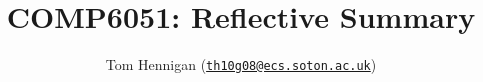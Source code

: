 \documentclass[10pt,a4paper]{article}
\newcommand{\mailto}[1]{\href{mailto:#1}{\nolinkurl{#1}}}
\begin{document}
\title{COMP6051: Reflective Summary}
\author{Tom Hennigan (\mailto{th10g08@ecs.soton.ac.uk})}
\maketitle


% 
% 
\end{document}
